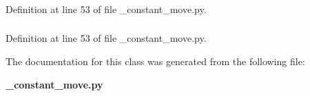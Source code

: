 \subsubsection[{speeds}]{}\label{classarm_1_1msg_1_1__constant__move_1_1constant__move_a5c3810d236d3d9dab095dec69a068dd8}


\-Definition at line 53 of file \-\_\-constant\-\_\-move.\-py.

\subsubsection[{states}]{}\label{classarm_1_1msg_1_1__constant__move_1_1constant__move_aec19d960448c56de05348c0041b69f6a}


\-Definition at line 53 of file \-\_\-constant\-\_\-move.\-py.



\-The documentation for this class was generated from the following file\-:\begin{DoxyCompactItemize}
\item 
{\bf \-\_\-constant\-\_\-move.\-py}\end{DoxyCompactItemize}
